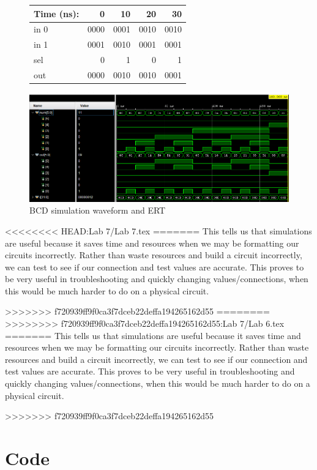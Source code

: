 \documentclass[11pt]{article}
\begin{document}
\begin{figure}[ht]\centering
	\begin{tabular}{l|rrrr}
		Time (ns): & 0 & 10 & 20 & 30 \\
		\midrule 
		in 0 & 0000 & 0001 & 0010 & 0010 \\
		in 1 & 0001 & 0010 & 0001 & 0001 \\
		sel & 0 & 1 & 0 & 1 \\
		\bottomrule
		out & 0000 & 0010 &0010 &0001 
	\end{tabular}\medskip
	
	\includegraphics[width=1.0\textwidth]{Part2.PNG}
	\caption{BCD simulation waveform and ERT}
	\label{fig:sim_with_table}
\end{figure}
\clearpage
<<<<<<<< HEAD:Lab 7/Lab 7.tex
=======
This tells us that simulations are useful because it saves time and resources when we may be formatting our circuits incorrectly. Rather than waste resources and build a circuit incorrectly, we can test to see if our connection and test values are accurate. This proves to be very useful in troubleshooting and quickly changing values/connections, when this would be much harder to do on a physical circuit.

>>>>>>> f720939ff9f0ca3f7dceb22deffa194265162d55
========
>>>>>>>> f720939ff9f0ca3f7dceb22deffa194265162d55:Lab 7/Lab 6.tex
=======
This tells us that simulations are useful because it saves time and resources when we may be formatting our circuits incorrectly. Rather than waste resources and build a circuit incorrectly, we can test to see if our connection and test values are accurate. This proves to be very useful in troubleshooting and quickly changing values/connections, when this would be much harder to do on a physical circuit.

>>>>>>> f720939ff9f0ca3f7dceb22deffa194265162d55





\section*{Code}
\end{document}
